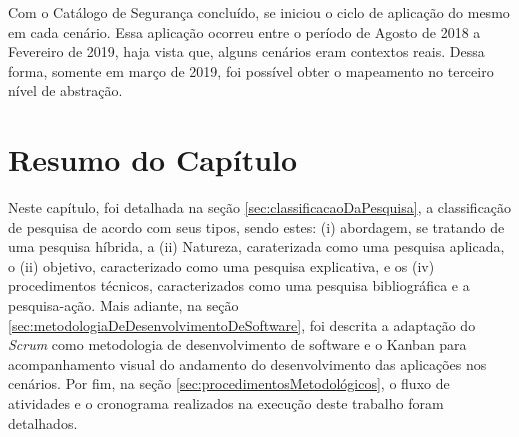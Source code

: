 Com o Catálogo de Segurança concluído, se iniciou o ciclo de aplicação do mesmo em cada cenário. Essa aplicação ocorreu entre o período de Agosto de 2018 a Fevereiro de 2019, haja vista que, alguns cenários eram contextos reais. Dessa forma, somente em março de 2019, foi possível obter o mapeamento no terceiro nível de abstração.

\section*{Resumo do Capítulo}

Neste capítulo, foi detalhada na seção \ref{sec:classificacaoDaPesquisa}, a classificação de pesquisa de acordo com seus tipos, sendo estes: (i) abordagem, se tratando de uma pesquisa híbrida, a (ii) Natureza, caraterizada como uma pesquisa aplicada, o (ii) objetivo, caracterizado como uma pesquisa explicativa, e os (iv) procedimentos técnicos, caracterizados como uma pesquisa bibliográfica e a pesquisa-ação. Mais adiante, na seção \ref{sec:metodologiaDeDesenvolvimentoDeSoftware}, foi descrita a adaptação do \textit{Scrum} como metodologia de desenvolvimento de software e o Kanban para acompanhamento visual do andamento do desenvolvimento das aplicações nos cenários. Por fim, na seção \ref{sec:procedimentosMetodológicos}, o fluxo de atividades e o cronograma realizados na execução deste trabalho foram detalhados.

